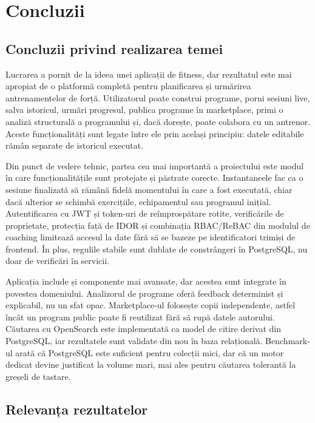 \chapter{Concluzii}
\label{cap:concluzii}

\section{Concluzii privind realizarea temei}

Lucrarea a pornit de la ideea unei aplicații de fitness, dar rezultatul este mai apropiat de o
platformă completă pentru planificarea și urmărirea antrenamentelor de forță. Utilizatorul poate
construi programe, porni sesiuni live, salva istoricul, urmări progresul, publica programe în
marketplace, primi o analiză structurală a programului și, dacă dorește, poate colabora cu un antrenor.
Aceste funcționalități sunt legate între ele prin același principiu: datele editabile rămân separate de
istoricul executat.

Din punct de vedere tehnic, partea cea mai importantă a proiectului este modul în care funcționalitățile
sunt protejate și păstrate corecte. Instantaneele fac ca o sesiune finalizată să rămână fidelă
momentului în care a fost executată, chiar dacă ulterior se schimbă exercițiile, echipamentul sau
programul inițial. Autentificarea cu JWT și token-uri de reîmprospătare rotite, verificările de
proprietate, protecția față de IDOR și combinația RBAC/ReBAC din modulul de coaching limitează accesul
la date fără să se bazeze pe identificatori trimiși de frontend. În plus, regulile stabile sunt dublate
de constrângeri în PostgreSQL, nu doar de verificări în servicii.

Aplicația include și componente mai avansate, dar acestea sunt integrate în povestea domeniului.
Analizorul de programe oferă feedback determinist și explicabil, nu un sfat opac. Marketplace-ul
folosește copii independente, astfel încât un program public poate fi reutilizat fără să rupă datele
autorului. Căutarea cu OpenSearch este implementată ca model de citire derivat din PostgreSQL, iar
rezultatele sunt validate din nou în baza relațională. Benchmark-ul arată că PostgreSQL este suficient
pentru colecții mici, dar că un motor dedicat devine justificat la volume mari, mai ales pentru
căutarea tolerantă la greșeli de tastare.

\section{Relevanța rezultatelor}

